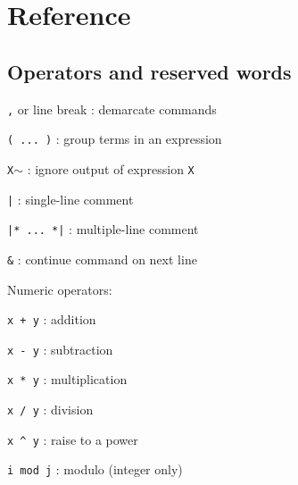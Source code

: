 \documentclass{article}
\begin{document}
\newpage



\section{Reference}




\subsection{Operators and reserved words}   

\small

\noindent
\begin{description}
\item{\verb#,# or line break} :  demarcate commands
\item{\verb#( ... )#} :  group terms in an expression
\item{\verb#X#$\sim$} :  ignore output of expression \verb#X#
\item{\verb#|#} :  single-line comment
\item{\verb#|* ... *|#} :  multiple-line comment
\item{\verb#&#} :  continue command on next line\\
\end{description}

\noindent
Numeric operators:
\begin{description}
\item{\verb#x + y#} :  addition
\item{\verb#x - y#} :  subtraction
\item{\verb#x * y#} :  multiplication
\item{\verb#x / y#} :  division
\item{\verb#x ^ y#} :  raise to a power
\item{\verb#i mod j#} :  modulo (integer only)\\
\end{description}
\end{document}
